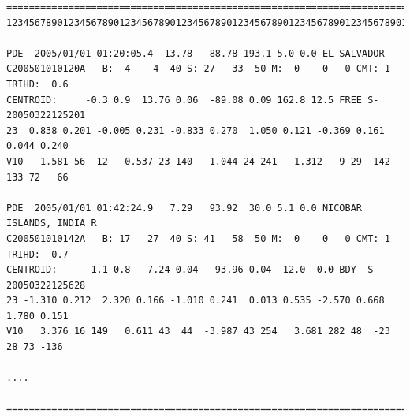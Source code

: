 \begin{center}
\begin{verbatim}
================================================================================
12345678901234567890123456789012345678901234567890123456789012345678901234567890

PDE  2005/01/01 01:20:05.4  13.78  -88.78 193.1 5.0 0.0 EL SALVADOR             
C200501010120A   B:  4    4  40 S: 27   33  50 M:  0    0   0 CMT: 1 TRIHD:  0.6
CENTROID:     -0.3 0.9  13.76 0.06  -89.08 0.09 162.8 12.5 FREE S-20050322125201
23  0.838 0.201 -0.005 0.231 -0.833 0.270  1.050 0.121 -0.369 0.161  0.044 0.240
V10   1.581 56  12  -0.537 23 140  -1.044 24 241   1.312   9 29  142 133 72   66

PDE  2005/01/01 01:42:24.9   7.29   93.92  30.0 5.1 0.0 NICOBAR ISLANDS, INDIA R
C200501010142A   B: 17   27  40 S: 41   58  50 M:  0    0   0 CMT: 1 TRIHD:  0.7
CENTROID:     -1.1 0.8   7.24 0.04   93.96 0.04  12.0  0.0 BDY  S-20050322125628
23 -1.310 0.212  2.320 0.166 -1.010 0.241  0.013 0.535 -2.570 0.668  1.780 0.151
V10   3.376 16 149   0.611 43  44  -3.987 43 254   3.681 282 48  -23  28 73 -136

....

================================================================================
\end{verbatim}
\end{center}

